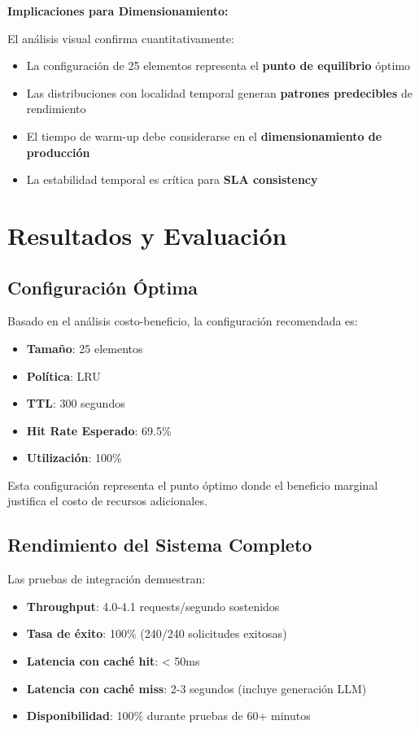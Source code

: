 \documentclass[12pt,a4paper]{article}
\begin{document}
\textbf{Implicaciones para Dimensionamiento:}

El análisis visual confirma cuantitativamente:
\begin{itemize}
\item La configuración de 25 elementos representa el \textbf{punto de equilibrio} óptimo
\item Las distribuciones con localidad temporal generan \textbf{patrones predecibles} de rendimiento
\item El tiempo de warm-up debe considerarse en el \textbf{dimensionamiento de producción}
\item La estabilidad temporal es crítica para \textbf{SLA consistency}
\end{itemize}

\section{Resultados y Evaluación}

\subsection{Configuración Óptima}

Basado en el análisis costo-beneficio, la configuración recomendada es:

\begin{itemize}
\item \textbf{Tamaño}: 25 elementos
\item \textbf{Política}: LRU
\item \textbf{TTL}: 300 segundos
\item \textbf{Hit Rate Esperado}: 69.5\%
\item \textbf{Utilización}: 100\%
\end{itemize}

Esta configuración representa el punto óptimo donde el beneficio marginal justifica el costo de recursos adicionales.

\subsection{Rendimiento del Sistema Completo}

Las pruebas de integración demuestran:

\begin{itemize}
\item \textbf{Throughput}: 4.0-4.1 requests/segundo sostenidos
\item \textbf{Tasa de éxito}: 100\% (240/240 solicitudes exitosas)
\item \textbf{Latencia con caché hit}: < 50ms
\item \textbf{Latencia con caché miss}: 2-3 segundos (incluye generación LLM)
\item \textbf{Disponibilidad}: 100\% durante pruebas de 60+ minutos
\end{itemize}
\end{document}
